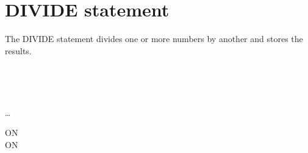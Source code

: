 \section{DIVIDE statement}

The DIVIDE statement divides one or more numbers by another and stores the results.

\begin{syntax}
  \begin{1=}
    \identifier \\
    \literal
  \end{1=}
  \begin{1=}
    \begin{1=}
      \identifier \\
      \literal
    \end{1=}
    \begin{0-1}
    \end{0-1}
  \end{1=} \ldots

  \begin{0+}
    ON   \imperativestatement \\
     ON   \imperativestatement
  \end{0+}

  \begin{0-1}
  \end{0-1}
\end{syntax}

